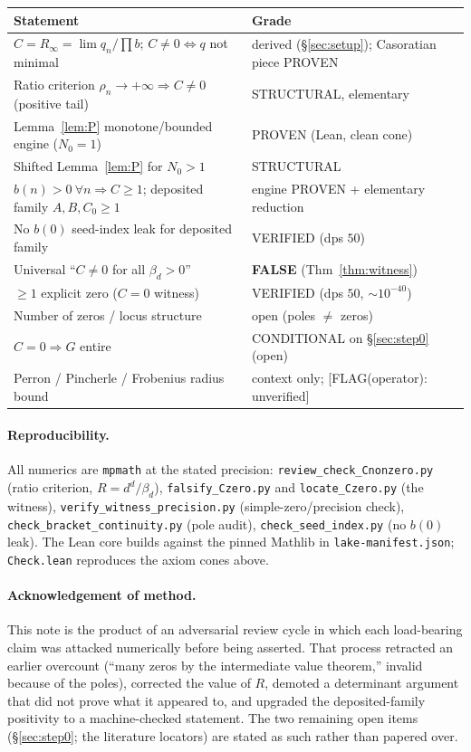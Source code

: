 \documentclass[11pt]{article}
\newcommand{\Rinf}{R_\infty}
\newcommand{\flag}[1]{{\color{red}\textsf{[FLAG(operator): #1]}}}
\begin{document}
\begin{center}
\small
\begin{tabular}{p{}p{}}
\hline
Statement & Grade \\
\hline
$C=\Rinf=\lim q_n/\prod b$; $C\neq0\Leftrightarrow q$ not minimal & derived (\S\ref{sec:setup}); Casoratian piece PROVEN \\
Ratio criterion $\rho_n\to+\infty\Rightarrow C\neq0$ (positive tail) & STRUCTURAL, elementary \\
Lemma~\ref{lem:P} monotone/bounded engine ($N_0=1$) & PROVEN (Lean, clean cone) \\
Shifted Lemma~\ref{lem:P} for $N_0>1$ & STRUCTURAL \\
$b(n)>0\ \forall n\Rightarrow C\ge1$; deposited family $A,B,C_0\ge1$ & engine PROVEN + elementary reduction \\
No $b(0)$ seed-index leak for deposited family & VERIFIED (dps $50$) \\
Universal ``$C\neq0$ for all $\beta_d>0$'' & \textbf{FALSE} (Thm~\ref{thm:witness}) \\
$\ge1$ explicit zero ($C=0$ witness) & VERIFIED (dps $50$, $\sim10^{-40}$) \\
Number of zeros / locus structure & open (poles $\neq$ zeros) \\
$C=0\Rightarrow G$ entire & CONDITIONAL on \S\ref{sec:step0} (open) \\
Perron / Pincherle / Frobenius radius bound & context only; \flag{unverified} \\
\hline
\end{tabular}
\end{center}

\paragraph{Reproducibility.}
All numerics are \texttt{mpmath} at the stated precision:
\texttt{review\_check\_Cnonzero.py} (ratio criterion, $R=d^d/\beta_d$),
\texttt{falsify\_Czero.py} and \texttt{locate\_Czero.py} (the witness),
\texttt{verify\_witness\_precision.py} (simple-zero/precision check),
\texttt{check\_bracket\_continuity.py} (pole audit),
\texttt{check\_seed\_index.py} (no $b(0)$ leak). The Lean core builds against the
pinned Mathlib in \texttt{lake-manifest.json}; \texttt{Check.lean} reproduces the
axiom cones above.

\paragraph{Acknowledgement of method.}
This note is the product of an adversarial review cycle in which each load-bearing
claim was attacked numerically before being asserted. That process retracted an
earlier overcount (``many zeros by the intermediate value theorem,'' invalid
because of the poles), corrected the value of $R$, demoted a determinant argument
that did not prove what it appeared to, and upgraded the deposited-family
positivity to a machine-checked statement. The two remaining open items
(\S\ref{sec:step0}; the literature locators) are stated as such rather than papered
over.
\end{document}
